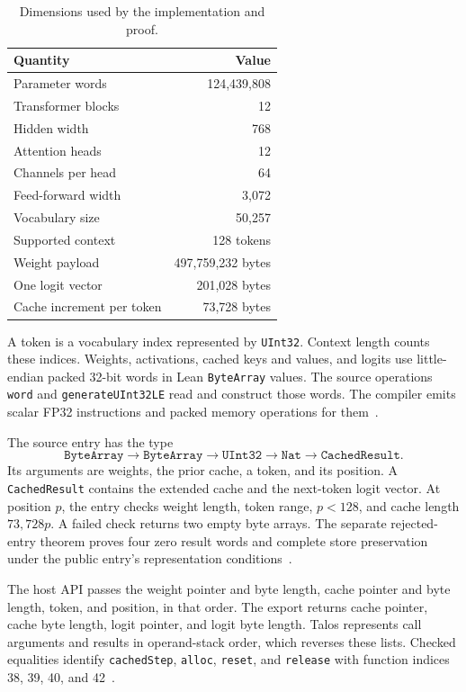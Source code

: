 \documentclass[11pt]{article}
\newcommand{\code}[1]{\texttt{#1}}
\begin{document}
\begin{table}[ht]
\centering
\begin{tabular}{lr}
\toprule
Quantity & Value\\
\midrule
Parameter words & 124,439,808\\
Transformer blocks & 12\\
Hidden width & 768\\
Attention heads & 12\\
Channels per head & 64\\
Feed-forward width & 3,072\\
Vocabulary size & 50,257\\
Supported context & 128 tokens\\
Weight payload & 497,759,232 bytes\\
One logit vector & 201,028 bytes\\
Cache increment per token & 73,728 bytes\\
\bottomrule
\end{tabular}
\caption{Dimensions used by the implementation and proof.}
\label{tab:shape}
\end{table}

A token is a vocabulary index represented by \code{UInt32}.  Context length counts these indices.  Weights, activations, cached keys and values, and logits use little-endian packed 32-bit words in Lean \code{ByteArray} values.  The source operations \code{word} and \code{generateUInt32LE} read and construct those words.  The compiler emits scalar FP32 instructions and packed memory operations for them~\cite{kernels,packed}.

The source entry has the type
\[
\code{ByteArray}\to\code{ByteArray}\to\code{UInt32}\to\code{Nat}\to\code{CachedResult}.
\]
Its arguments are weights, the prior cache, a token, and its position.  A \code{CachedResult} contains the extended cache and the next-token logit vector.  At position $p$, the entry checks weight length, token range, $p<128$, and cache length $73{,}728p$.  A failed check returns two empty byte arrays.  The separate rejected-entry theorem proves four zero result words and complete store preservation under the public entry's representation conditions~\cite{entry}.

The host API passes the weight pointer and byte length, cache pointer and byte length, token, and position, in that order.  The export returns cache pointer, cache byte length, logit pointer, and logit byte length.  Talos represents call arguments and results in operand-stack order, which reverses these lists.  Checked equalities identify \code{cachedStep}, \code{alloc}, \code{reset}, and \code{release} with function indices 38, 39, 40, and 42~\cite{initialize}.
\end{document}
